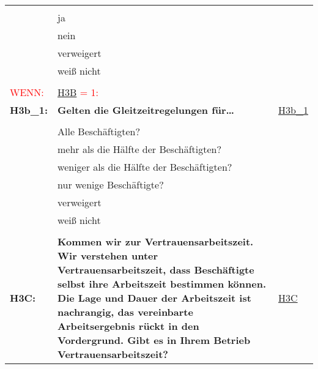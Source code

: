 \begin{longtable}{!{\color{black}\vline width 1pt}  L{2cm}!{\color{black}\vline width 1pt} L{12.25cm}!{\color{black}\vline width 1pt}  L{2.5cm}!{\color{black}\vline width 1pt}}
   &  &  \\ 
   & ja &  \\ 
   & nein &  \\ 
   & verweigert &  \\ 
   & weiß nicht &  \\ 
   &  &  \\ 
   \midrule
{}\textcolor{red}{WENN:} & \textcolor{red}{ \hyperref[H3B]{H3B} = 1:} &  \\ 
  \textbf{H3b\_1:}\label{H3b:1} & \textbf{Gelten die Gleitzeitregelungen für…} & \hyperref[var:H3b:1]{H3b\_1} \\ 
   &  &  \\ 
   & Alle Beschäftigten? &  \\ 
   & mehr als die Hälfte der Beschäftigten? &  \\ 
   & weniger als die Hälfte der Beschäftigten? &  \\ 
   & nur wenige Beschäftigte? &  \\ 
   & verweigert &  \\ 
   & weiß nicht &  \\ 
   &  &  \\ 
   \midrule
{}\textbf{H3C:}\label{H3C} & \textbf{Kommen wir zur Vertrauensarbeitszeit. Wir verstehen unter Vertrauensarbeitszeit, dass Beschäftigte selbst ihre  Arbeitszeit  bestimmen können. Die Lage und Dauer der Arbeitszeit ist nachrangig, das vereinbarte Arbeitsergebnis rückt in den Vordergrund. Gibt es in Ihrem Betrieb Vertrauensarbeitszeit?} & \hyperref[var:H3C]{H3C} \\ 

\end{longtable}
